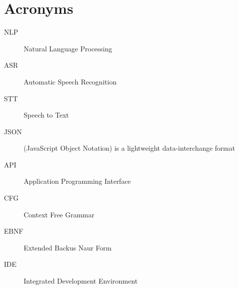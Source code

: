 
\chapter{Acronyms}
\begin{description}
	\item[NLP] Natural Language Processing
	\item[ASR] Automatic Speech Recognition
	\item[STT] Speech to Text
	\item[JSON] (JavaScript Object Notation) is a lightweight data-interchange format
	\item[API] Application Programming Interface
	\item[CFG] Context Free Grammar
	\item[EBNF] Extended Backus Naur Form
	\item[IDE] Integrated Development Environment 
\end{description}